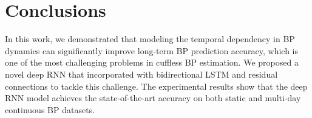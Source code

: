 \documentclass[letterpaper, 10 pt, conference]{ieeeconf}
\begin{document}
\section{Conclusions}
In this work, we demonstrated that modeling the temporal dependency in BP dynamics can significantly improve long-term BP prediction accuracy, which is one of the most challenging problems in cuffless BP estimation.
We proposed a novel deep RNN that incorporated with bidirectional LSTM and residual connections to tackle this challenge.
The experimental results show that the deep RNN model
achieves the state-of-the-art accuracy on both static and multi-day continuous BP datasets.



\end{document}
